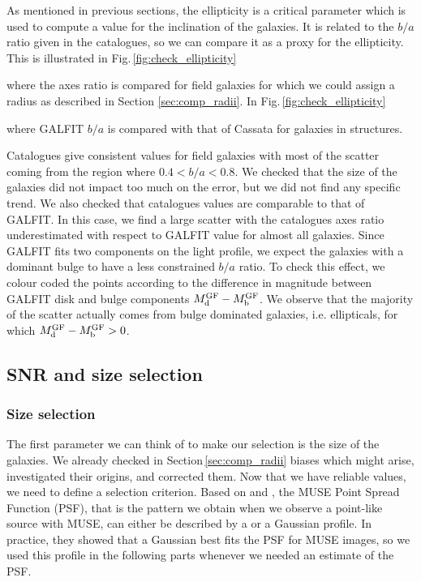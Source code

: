 As mentioned in previous sections, the ellipticity is a critical parameter which is used to compute a value for the inclination of the galaxies. It is related to the $b/a$ ratio given in the catalogues, so we can compare it as a proxy for the ellipticity. This is illustrated in Fig.\,\ref{fig:check_ellipticity} 
\begin{enumerate*}[label={(\alph*)}]
	\item where the axes ratio is compared for field galaxies for which we could assign a radius as described in Section \ref{sec:comp_radii}. In Fig.\,\ref{fig:check_ellipticity}
	\item where GALFIT $b/a$ is compared with that of Cassata for galaxies in structures.
\end{enumerate*}
Catalogues give consistent values for field galaxies with most of the scatter coming from the region where $0.4 < b/a < 0.8$. We checked that the size of the galaxies did not impact too much on the error, but we did not find any specific trend. We also checked that catalogues values are comparable to that of GALFIT. In this case, we find a large scatter with the catalogues axes ratio underestimated with respect to GALFIT value for almost all galaxies. Since GALFIT fits two components on the light profile, we expect the galaxies with a dominant bulge to have a less constrained $b/a$ ratio. To check this effect, we colour coded the points according to the difference in magnitude between GALFIT disk and bulge components $M_{\rm{d}}^{\rm{GF}} - M_{\rm{b}}^{\rm{GF}}$. We observe that the majority of the scatter actually comes from bulge dominated galaxies, i.e. ellipticals, for which $M_{\rm{d}}^{\rm{GF}} - M_{\rm{b}}^{\rm{GF}} > 0$.














\newpage
\subsection{SNR and size selection}
\label{sec:cut}

\subsubsection{Size selection}
\label{sec:cut_size}

The first parameter we can think of to make our selection is the size of the galaxies. We already checked in Section\,\ref{sec:comp_radii} biases which might arise, investigated their origins, and corrected them. Now that we have reliable values, we need to define a selection criterion. Based on  and , the MUSE Point Spread Function (PSF), that is the pattern we obtain when we observe a point-like source with MUSE, can either be described by   a  or a Gaussian profile. In practice, they showed that a Gaussian best fits the PSF for MUSE images, so we used this profile in the following parts whenever we needed an estimate of the PSF. \\

